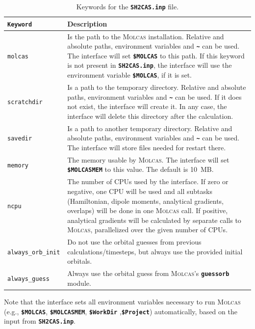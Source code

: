 \documentclass[a4paper,11pt,DIV=15,openany,twoside=false]{scrbook}
\newcommand{\ttt}[1]{\textbf{\texttt{#1}}}
\begin{document}
\begin{table}
  \centering
  \caption{Keywords for the \ttt{SH2CAS.inp} file.}
  \label{tab:molcas_sh2}
  \begin{tabular}{>{\tt}lp{12cm}}
  \toprule
  Keyword       &Description\\
  \midrule
molcas          &Is the path to the \textsc{Molcas} installation. Relative and absolute paths, environment variables and \ttt{\textasciitilde} can be used. The interface will set \ttt{\$MOLCAS} to this path. If this keyword is not present in \ttt{SH2CAS.inp}, the interface will use the environment variable \ttt{\$MOLCAS}, if it is set.\\
scratchdir      &Is a path to the temporary directory. Relative and absolute paths, environment variables and \ttt{\textasciitilde} can be used. If it does not exist, the interface will create it. In any case, the interface will delete this directory after the calculation.\\
savedir         &Is a path to another temporary directory.  Relative and absolute paths, environment variables and \ttt{\textasciitilde} can be used. The interface will store files needed for restart there.\\
memory          &The memory usable by \textsc{Molcas}. The interface will set \ttt{\$MOLCASMEM} to this value. The default is 10~MB.\\
ncpu            & The number of CPUs used by the interface. If zero or negative, one CPU will be used and all subtasks (Hamiltonian, dipole moments, analytical gradients, overlaps) will be done in one \textsc{Molcas} call. If positive, analytical gradients will be calculated by separate calls to \textsc{Molcas}, parallelized over the given number of CPUs. \\
always\_orb\_init &Do not use the orbital guesses from previous calculations/timesteps, but always use the provided initial orbitals.\\
always\_guess   &Always use the orbital guess from \textsc{Molcas}'s \ttt{guessorb} module.\\
  \bottomrule
  \end{tabular}
\end{table}

Note that the interface sets all environment variables necessary to run \textsc{Molcas} (e.g., \ttt{\$MOLCAS}, \ttt{\$MOLCASMEM}, \ttt{\$WorkDir} ,\ttt{\$Project}) automatically, based on the input from \ttt{SH2CAS.inp}.
\end{document}
